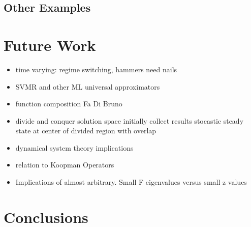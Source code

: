 \documentclass[12pt]{article}
\begin{document}
\subsection{ Other Examples}
\label{sec:otherexamples}



\section{Future Work}
\label{sec:future}

\begin{itemize}
\item time varying:  regime switching, hammers need nails
\item SVMR and other ML universal approximators
\item function composition Fa Di Bruno
\item divide and conquer solution space initially collect results stocastic steady state at center of divided region with overlap
\item dynamical system theory implications
\item relation to Koopman Operators
\item Implications of almost arbitrary.  Small F eigenvalues versus small z values
\end{itemize}

\section{Conclusions}
\label{sec:conc}






\end{document}
